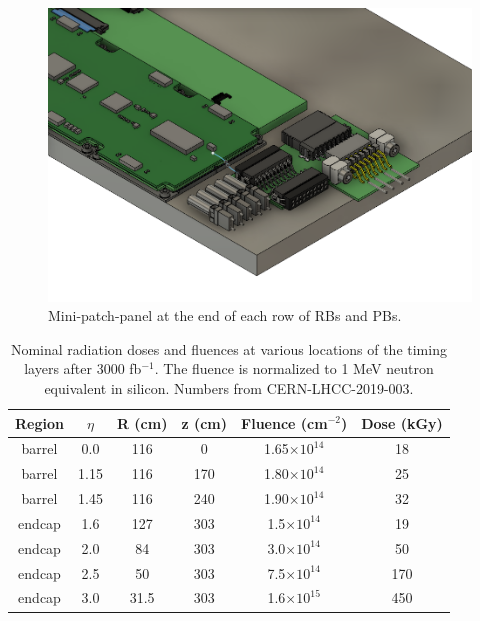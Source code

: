 \documentclass[11pt]{article}
\begin{document}
\begin{figure}[!ht]
\centering
\includegraphics[width=0.70 \textwidth]{figures/patch_panel_3D.png}
\caption{
Mini-patch-panel at the end of each row of RBs and PBs.
}
\label{fig:patchpanel}
\end{figure}

\begin{table}[!hb]
  \centering
  \caption{Nominal radiation doses and fluences at various locations of the timing layers after 3000 fb$^{-1}$. The fluence is normalized to 1 MeV neutron equivalent in silicon.
  Numbers from CERN-LHCC-2019-003.}
  \begin{tabular}{ c c c c c c }
    Region & $\eta$ & R (cm) & z (cm) & Fluence (cm$^{-2}$) & Dose (kGy) \\
    \midrule
    barrel & 0.0    & 116    & 0      & 1.65$\times 10^{14}$ & 18         \\
    barrel & 1.15   & 116    & 170    & 1.80$\times 10^{14}$ & 25         \\
    barrel & 1.45   & 116    & 240    & 1.90$\times 10^{14}$ & 32         \\
    endcap & 1.6    & 127    & 303    & 1.5$\times 10^{14}$ & 19         \\
    endcap & 2.0    & 84     & 303    & 3.0$\times 10^{14}$ & 50         \\
    endcap & 2.5    & 50     & 303    & 7.5$\times 10^{14}$ & 170        \\
    endcap & 3.0    & 31.5   & 303    & 1.6$\times 10^{15}$ & 450        \\
  \end{tabular}
  \label{tab:radiation-doses}
\end{table}
\end{document}
